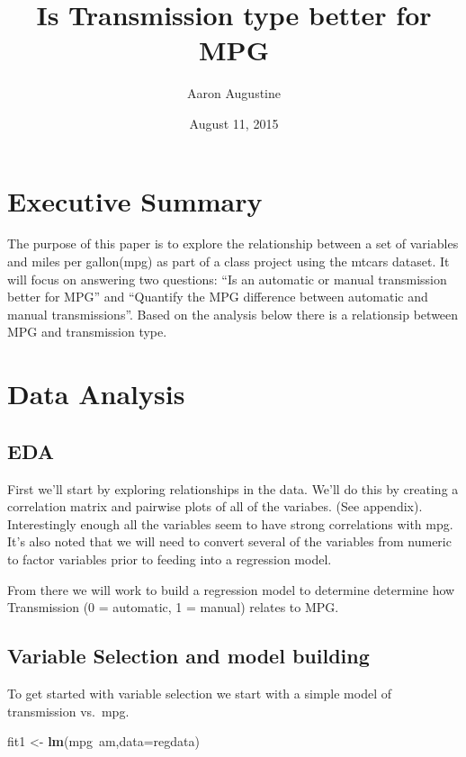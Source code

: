 \documentclass[]{article}
\title{Is Transmission type better for MPG}
\author{Aaron Augustine}
\date{August 11, 2015}
\newenvironment{Shaded}{\begin{snugshade}}{\end{snugshade}}
\newcommand{\KeywordTok}[1]{\textcolor[rgb]{0.13,0.29,0.53}{\textbf{{#1}}}}
\newcommand{\DataTypeTok}[1]{\textcolor[rgb]{0.13,0.29,0.53}{{#1}}}
\newcommand{\StringTok}[1]{\textcolor[rgb]{0.31,0.60,0.02}{{#1}}}
\newcommand{\NormalTok}[1]{{#1}}
\begin{document}
\maketitle


\section{Executive Summary}\label{executive-summary}

The purpose of this paper is to explore the relationship between a set
of variables and miles per gallon(mpg) as part of a class project using
the mtcars dataset. It will focus on answering two questions: ``Is an
automatic or manual transmission better for MPG'' and ``Quantify the MPG
difference between automatic and manual transmissions''. Based on the
analysis below there is a relationsip between MPG and transmission type.

\section{Data Analysis}\label{data-analysis}

\subsection{EDA}\label{eda}

First we'll start by exploring relationships in the data. We'll do this
by creating a correlation matrix and pairwise plots of all of the
variabes. (See appendix). Interestingly enough all the variables seem to
have strong correlations with mpg. It's also noted that we will need to
convert several of the variables from numeric to factor variables prior
to feeding into a regression model.

From there we will work to build a regression model to determine
determine how Transmission (0 = automatic, 1 = manual) relates to MPG.

\subsection{Variable Selection and model
building}\label{variable-selection-and-model-building}

To get started with variable selection we start with a simple model of
transmission vs.~mpg.

\begin{Shaded}
\begin{Highlighting}[]
\NormalTok{fit1 <-}\StringTok{ }\KeywordTok{lm}\NormalTok{(mpg~am,}\DataTypeTok{data=}\NormalTok{regdata)}
\end{Highlighting}
\end{Shaded}
\end{document}
